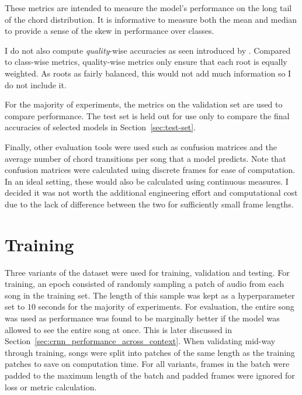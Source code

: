These metrics are intended to measure the model's performance on the long tail of the chord distribution. It is informative to measure both the mean and median to provide a sense of the skew in performance over classes.

I do not also compute \emph{quality}-wise accuracies as seen introduced by \citet{CurriculumLearning}. Compared to class-wise metrics, quality-wise metrics only ensure that each root is equally weighted. As roots as fairly balanced, this would not add much information so I do not include it.

For the majority of experiments, the metrics on the validation set are used to compare performance. The test set is held out for use only to compare the final accuracies of selected models in Section~\ref{sec:test-set}.

Finally, other evaluation tools were used such as confusion matrices and the average number of chord transitions per song that a model predicts. Note that confusion matrices were calculated using discrete frames for ease of computation. In an ideal setting, these would also be calculated using continuous measures. I decided it was not worth the additional engineering effort and computational cost due to the lack of difference between the two for sufficiently small frame lengths.

\section{Training}\label{sec:training}

Three variants of the dataset were used for training, validation and testing. For training, an epoch consisted of randomly sampling a patch of audio from each song in the training set. The length of this sample was kept as a hyperparameter set to $10$ seconds for the majority of experiments. For evaluation, the entire song was used as performance was found to be marginally better if the model was allowed to see the entire song at once. This is later discussed in Section~\ref{sec:crnn_performance_across_context}. When validating mid-way through training, songs were split into patches of the same length as the training patches to save on computation time. For all variants, frames in the batch were padded to the maximum length of the batch and padded frames were ignored for loss or metric calculation.

